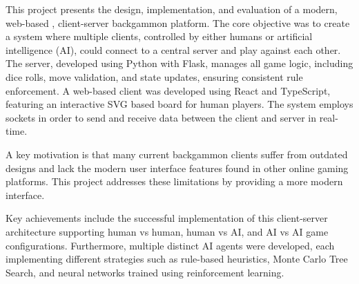 

This project presents the design, implementation, and evaluation of a modern, web-based , client-server backgammon platform. The core objective was to create a system where multiple clients, controlled by either humans or artificial intelligence (AI), could connect to a central server and play against each other. The server, developed using Python with Flask, manages all game logic, including dice rolls, move validation, and state updates, ensuring consistent rule enforcement. A web-based client was developed using React and TypeScript, featuring an interactive SVG based board for human players. The system employs sockets in order to send and receive data between the client and server in real-time.  

A key motivation is that many current backgammon clients suffer from outdated designs and lack the modern user interface features found in other online gaming platforms. This project addresses these limitations by providing a more modern interface.

Key achievements include the successful implementation of this client-server architecture supporting human vs human, human vs AI, and AI vs AI game configurations. Furthermore, multiple distinct AI agents were developed, each implementing different strategies such as rule-based heuristics, Monte Carlo Tree Search, and neural networks trained using reinforcement learning. 